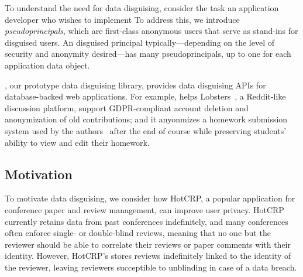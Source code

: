 %
To understand the need for data disguising, consider the task an application
developer who wishes to implement 
%
%
%
%
To address this, we introduce \emph{pseudoprincipals}, which are first-class anonymous
users that serve as stand-ins for disguised users.
%
An disguised principal typically---depending on the level of security and anonymity
desired---has many pseudoprincipals, up to one for each application data object.
%

%
\sys, our prototype data disguising library, provides data disguising APIs for
database-backed web applications.
%
For example, \sys helps Lobsters~\cite{lobsters}, a Reddit-like discussion platform,
support GDPR-compliant account deletion and anonymization of old contributions; and it
anyonmizes a homework submission system used by the authors~\cite{websubmit-rs-anon}
after the end of course while preserving students' ability to view and edit their
homework.
%


\subsection{Motivation}
To motivate data disguising, we consider how HotCRP, a popular application for conference paper and
review management, can improve user privacy.  HotCRP currently retains data from past conferences
indefinitely, and many conferences often enforce single- or double-blind reviews, meaning that no
one but the reviewer should be able to correlate their reviews or paper comments with their
identity. However, HotCRP's stores reviews indefinitely linked to the identity of the reviewer,
leaving reviewers succeptible to unblinding in case of a data breach.

